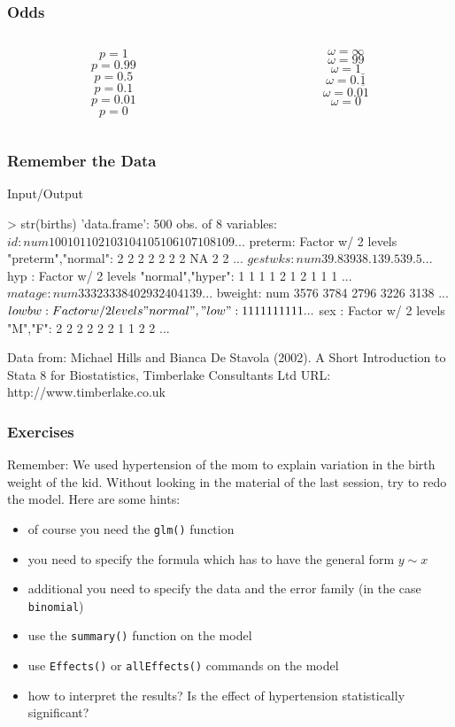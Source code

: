 \begin{frame}\frametitle{Odds}
\begin{columns}
  \begin{column}{0.4\textwidth}
    $$p = 1$$
    $$p = 0.99$$
    $$p = 0.5$$
    $$p = 0.1$$
    $$p = 0.01$$
    $$p = 0$$    
  \end{column}
  \begin{column}{0.4\textwidth}
    $$\omega = \infty$$
    $$\omega = 99$$
    $$\omega = 1$$
    $$\omega = 0.\bar{1}$$
    $$\omega = 0.\overline{01}$$
    $$\omega = 0$$
  \end{column}
\end{columns}
\end{frame}


\begin{frame}[fragile]\frametitle{Remember the Data}
\footnotesize
\begin{exampleblock}{Input/Output}
\begin{semiverbatim}
  > str(births)
  'data.frame':	500 obs. of  8 variables:
 $ id     : num  100 101 102 103 104 105 106 107 108 109 ...
 $ preterm: Factor w/ 2 levels "preterm","normal": 2 2 2 2 2 2 2 NA 2 2 ...
 $ gestwks: num  39.8 39 38.1 39.5 39.5 ...
 $ hyp    : Factor w/ 2 levels "normal","hyper": 1 1 1 1 2 1 2 1 1 1 ...
 $ matage : num  33 32 33 38 40 29 32 40 41 39 ...
 $ bweight: num  3576 3784 2796 3226 3138 ...
 $ lowbw  : Factor w/ 2 levels "normal","low": 1 1 1 1 1 1 1 1 1 1 ...
 $ sex    : Factor w/ 2 levels "M","F": 2 2 2 2 2 2 1 1 2 2 ...
\end{semiverbatim}
\end{exampleblock}
Data from: Michael Hills and Bianca De Stavola (2002). A Short Introduction
     to Stata 8 for Biostatistics, Timberlake Consultants Ltd URL:
     http://www.timberlake.co.uk
\end{frame}

\begin{frame}[fragile]\frametitle{Exercises}
Remember: We used hypertension of the mom to explain variation in the birth weight of the kid. Without looking in the material of the last session, try to redo the model. Here are some hints:
\begin{itemize}
\item of course you need the \texttt{glm()} function
\item you need to specify the formula which has to have the general form $y \sim x$
\item additional you need to specify the data and the error family (in the case \texttt{binomial})
\item use the \texttt{summary()} function on the model
\item use \texttt{Effects()} or \texttt{allEffects()} commands on the model
\item how to interpret the results? Is the effect of hypertension statistically significant?
\end{itemize}
\end{frame}


